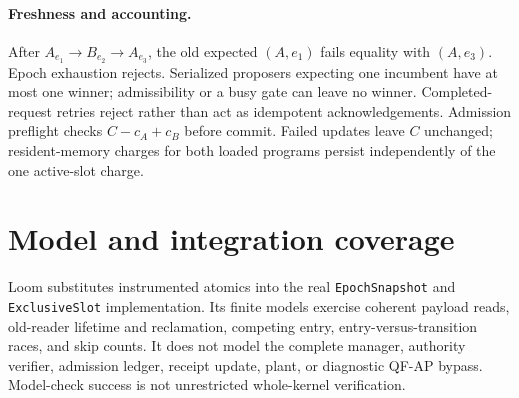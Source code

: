 \paragraph{Freshness and accounting.}
After $A_{e_1}\rightarrow B_{e_2}\rightarrow A_{e_3}$, the old expected $(A,e_1)$ fails equality with $(A,e_3)$. Epoch exhaustion rejects. Serialized proposers expecting one incumbent have at most one winner; admissibility or a busy gate can leave no winner. Completed-request retries reject rather than act as idempotent acknowledgements. Admission preflight checks $C-c_A+c_B$ before commit. Failed updates leave $C$ unchanged; resident-memory charges for both loaded programs persist independently of the one active-slot charge.

\section{Model and integration coverage}
\label{app:coverage}
Loom substitutes instrumented atomics into the real \texttt{EpochSnapshot} and \texttt{ExclusiveSlot} implementation. Its finite models exercise coherent payload reads, old-reader lifetime and reclamation, competing entry, entry-versus-transition races, and skip counts. It does not model the complete manager, authority verifier, admission ledger, receipt update, plant, or diagnostic QF-AP bypass. Model-check success is not unrestricted whole-kernel verification.

